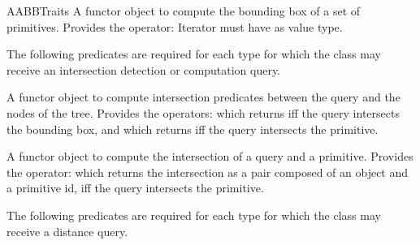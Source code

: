 \begin{ccRefConcept}{AABBTraits}
{A functor object to compute the bounding box of a set of primitives. Provides the operator:
 Iterator  must have  as value type. }

The following predicates are required for each type 
for which the class  may receive an intersection detection or computation query.

{} 
{A functor object to compute intersection predicates between the query and the nodes of the tree. Provides the operators:
 which returns  iff the query intersects the bounding box, and  which returns  iff the query intersects the primitive.}

{} 
{A functor object to compute the intersection of a query and a primitive. Provides the operator:
 which returns the intersection as a pair composed of an object and a primitive id, iff the query intersects the primitive.}

The following predicates are required for each type 
for which the class  may receive a distance query.


\end{ccRefConcept}
